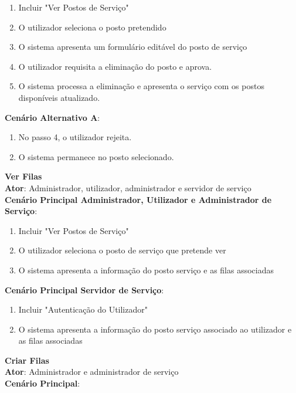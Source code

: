 \begin{enumerate}[nolistsep]
	\item Incluir "Ver Postos de Serviço"
	\item O utilizador seleciona o posto pretendido
	\item O sistema apresenta um formulário editável do posto de serviço
	\item O utilizador requisita a eliminação do posto e aprova.
	\item O sistema processa a eliminação e apresenta o serviço com os postos disponíveis atualizado.
\end{enumerate}

\textbf{Cenário Alternativo A}:

\begin{enumerate}[nolistsep]
	\item No passo 4, o utilizador rejeita.
	\item O sistema permanece no posto selecionado.
\end{enumerate}

{\large\textbf{Ver Filas}} \\
\textbf{Ator}: Administrador, utilizador, administrador e servidor de serviço\\
\textbf{Cenário Principal Administrador, Utilizador e Administrador de Serviço}:

\begin{enumerate}[nolistsep]
	\item Incluir "Ver Postos de Serviço" 
	\item O utilizador seleciona o posto de serviço que pretende ver 
	\item O sistema apresenta a informação do posto serviço e as filas associadas
\end{enumerate}

\textbf{Cenário Principal Servidor de Serviço}:

\begin{enumerate}[nolistsep]
	\item Incluir "Autenticação do Utilizador" 
	\item O sistema apresenta a informação do posto serviço associado ao utilizador e as filas associadas
\end{enumerate}

{\large\textbf{Criar Filas}} \\
\textbf{Ator}: Administrador e administrador de serviço \\
\textbf{Cenário Principal}:

